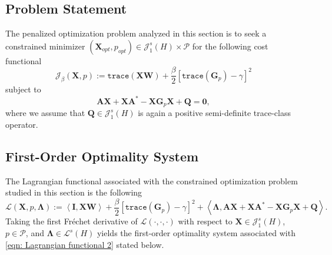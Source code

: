 \documentclass{amsart}
\newcommand{\sL}{\mathscr L}
\newcommand{\sJ}{\mathscr J}
\newcommand{\p}[1]{\left( {#1} \right)}
\newcommand{\br}[1]{\left[ #1 \right]}
\newcommand{\dual}[1]{\left< #1 \right>}
\newcommand{\trace}[1]{\texttt{trace}\left( #1\right)}
\newcommand{\sP}{\mathcal{P}}
\newcommand{\bA}{\mathbf A}
\newcommand{\bX}{\mathbf X}
\newcommand{\bQ}{\mathbf Q}
\newcommand{\bG}{\mathbf G}
\newcommand{\bLambda}{\boldsymbol{\Lambda}}
\newcommand{\bW}{\mathbf W}
\begin{document}
\subsection{Problem Statement}
The penalized optimization problem analyzed in this section is to seek a constrained minimizer $\p{\bX_{opt}, p_{opt}} \in \sJ_1^s(H) \times \sP$ for the following cost functional
\begin{equation}
\label{eqn: cost functional 2}
    \mathcal J_\beta (\bX, p) := \trace{\bX\bW} + \frac{\beta}{2} \br{\trace{\bG_p} - \gamma}^2
\end{equation}
subject to
\begin{equation}
    \bA\bX + \bX\bA^* - \bX\bG_p\bX+\bQ = \mathbf 0,
\end{equation}
where we assume that $\bQ \in \sJ_1^s(H)$ is again a positive semi-definite trace-class operator. 

\subsection{First-Order Optimality System}
The Lagrangian functional associated with the constrained optimization problem studied in this section is the following
\begin{equation} \label{eqn: Lagrangian functional 2}
    \mathcal L(\bX,p,\bLambda) := 
    \dual{\mathbf I, \bX\bW} 
    + \frac{\beta}{2}\br{\trace{\bG_p} - \gamma}^2
    + \dual{\bLambda, \bA \bX + \bX\bA^* - \bX\bG_p\bX + \bQ}.
\end{equation}
Taking the first Fr\'echet derivative of $\mathcal  L(\cdot,\cdot,\cdot)$ with respect to $\bX \in \sJ_1^s(H)$, $p \in \sP$, and $\bLambda \in \sL^s(H)$ yields the first-order optimality system associated with \eqref{eqn: Lagrangian functional 2} stated below. 
\end{document}
